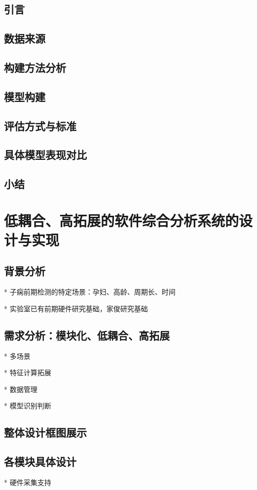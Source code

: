 \section{引言}

\section{数据来源}
\section{构建方法分析}
\section{模型构建}
\section{评估方式与标准}
\section{具体模型表现对比}
\section{小结}

\chapter{低耦合、高拓展的软件综合分析系统的设计与实现}
\section{背景分析}
* 子痫前期检测的特定场景：孕妇、高龄、周期长、时间

* 实验室已有前期硬件研究基础，家俊研究基础

\section{需求分析：模块化、低耦合、高拓展}
* 多场景

* 特征计算拓展

* 数据管理

* 模型识别判断

\section{整体设计框图展示}

\section{各模块具体设计}
* 硬件采集支持

